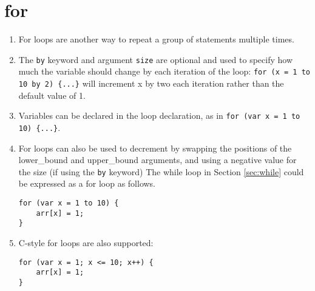 \section{for}
\begin{enumerate}
\begin{lstlisting}[numbers=none]
for (variable = lower_bound to upper_bound by size) {
	statements
}
\end{lstlisting}
	\item For loops are another way to repeat a group of statements multiple times.
	\item The \lstinline|by| keyword and argument \lstinline|size| are optional and used to specify how much the variable should change by each iteration of the loop: \lstinline|for (x = 1 to 10 by 2) {...}| will increment x by two each iteration rather than the default value of 1.
	\item Variables can be declared in the loop declaration, as in \lstinline|for (var x = 1 to 10) {...}|.
	\item For loops can also be used to decrement by swapping the positions of the lower_bound and upper_bound arguments, and using a negative value for the size (if using the \lstinline|by| keyword)
	The while loop in Section \ref{sec:while} could be expressed as a for loop as follows.
\begin{lstlisting}[numbers=none]
for (var x = 1 to 10) {
	arr[x] = 1;
}
\end{lstlisting}
	\item C-style for loops are also supported:
\begin{lstlisting}[numbers=none]
for (var x = 1; x <= 10; x++) {
	arr[x] = 1;
}
\end{lstlisting}
\end{enumerate}
